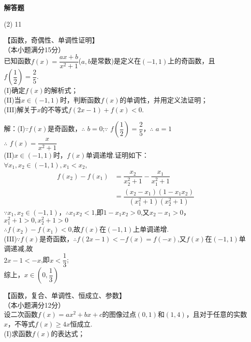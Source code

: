 \begin{exercise}{\bf 解答题}
\begin{answer}
        (2) 11
      \end{answer}
    \item 【函数，奇偶性、单调性证明】\\
      （本小题满分15分）\\
      已知函数$f(x)=\dfrac{ax+b}{x^2+1}$($a,b$是常数)是定义在$(-1,1)$上的奇函数，且$f(\dfrac{1}2)=\dfrac{2}5$.\\
      (I)确定$f(x)$的解析式；\\
      (II)当$x\in(-1,1)$时，判断函数$f(x)$的单调性，并用定义法证明；\\
      (III)解关于$x$的不等式$f(2x-1)+f(x)<0$.\\
      \begin{answer}
        解：(I)$\because$$f(x)$是奇函数，$\therefore$ $b=0$;$\because$ $f(\dfrac12)=\dfrac25$，$\therefore$ $a=1$\\
        $\therefore$ $f(x)=\dfrac{x}{x^2+1}$\\
        (II)$x\in(-1,1)$时，$f(x)$单调递增.证明如下：\\
        $\forall x_1,x_2\in(-1,1),x_1<x_2$,\\
        \begin{equation*}
          \begin{align*}
            f(x_2)-f(x_1)
            &=\dfrac{x_2}{x_2^2+1}-\dfrac{x_1}{x_1^2+1}\\
            &=\dfrac{(x_2-x_1)(1-x_1x_2)}{(x_1^2+1)(x_2^2+1)}
          \end{align*}
        \end{equation*}
         $\because x_1,x_2\in(-1,1)$，$\therefore x_1x_2<1$,即$1-x_1x_2>0$,又$x_2-x_1>0$，$x_1^2+1>0,x_2^2+1>0$\\
        $\therefore f(x_2)-f(x_1)<0$,故$f(x)$在$(-1,1)$上单调递增.\\
        (III)$\because f(x)$是奇函数，$\therefore f(2x-1)<-f(x)=f(-x)$,又$f(x)$在$(-1,1)$单调递减,故\\
        $2x-1<-x$,即$x<\dfrac13$;\\
        综上，$x\in (0,\dfrac13)$
      \end{answer}
    \item 【函数，复合、单调性、恒成立、参数】\\
      （本小题满分12分）\\
      设二次函数$f(x)=ax^2+bx+c$的图像过点$(0,1)$和$(1,4)$，且对于任意的实数$x$，不等式$f(x)\geq 4x$恒成立.\\
      (I)求函数$f(x)$的表达式；\\

\end{exercise}
